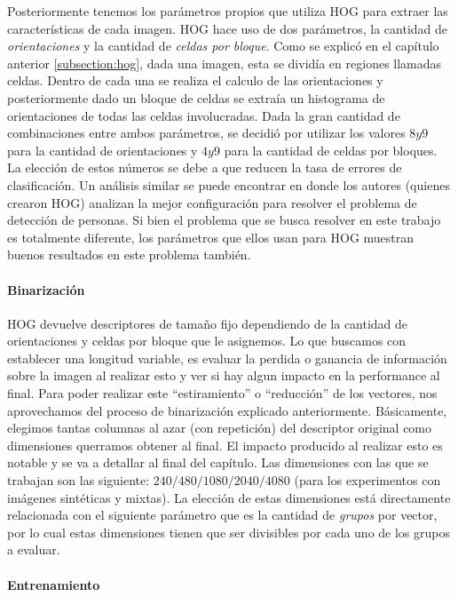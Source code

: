 	Posteriormente tenemos los parámetros propios que utiliza HOG para extraer las características de cada imagen. HOG hace uso de dos parámetros, la cantidad de \textit{orientaciones} y la cantidad de \textit{celdas por bloque}. Como se explicó en el capítulo anterior \ref{subsection:hog}, dada una imagen, esta se dividía en regiones llamadas celdas. Dentro de cada una se realiza el calculo de las orientaciones y posteriormente dado un bloque de celdas se extraía un histograma de orientaciones de todas las celdas involucradas. Dada la gran cantidad de combinaciones entre ambos parámetros, se decidió por utilizar los valores $8 y 9$ para la cantidad de orientaciones y $4 y 9$ para la cantidad de celdas por bloques. La elección de estos números se debe a que reducen la tasa de errores de clasificación. Un análisis similar se puede encontrar en \cite{DT05} donde los autores (quienes crearon HOG) analizan la mejor configuración para resolver el problema de detección de personas. Si bien el problema que se busca resolver en este trabajo es totalmente diferente, los parámetros que ellos usan para HOG muestran buenos resultados en este problema también.

	\paragraph{Binarización}

	HOG devuelve descriptores de tamaño fijo dependiendo de la cantidad de orientaciones y celdas por bloque que le asignemos. Lo que buscamos con establecer una longitud variable, es evaluar la perdida o ganancia de información sobre la imagen al realizar esto y ver si hay algun impacto en la performance al final. Para poder realizar este ``estiramiento'' o ``reducción'' de los vectores, nos aprovechamos del proceso de binarización explicado anteriormente. Básicamente, elegimos tantas columnas al azar (con repetición) del descriptor original como dimensiones querramos obtener al final. El impacto producido al realizar esto es notable y se va a detallar al final del capítulo. Las dimensiones con las que se trabajan son las siguiente: $240/480/1080/2040/4080$ (para los experimentos con imágenes sintéticas y mixtas). La elección de estas dimensiones está directamente relacionada con el siguiente parámetro que es la cantidad de \textit{grupos} por vector, por lo cual estas dimensiones tienen que ser divisibles por cada uno de los grupos a evaluar.

	\paragraph{Entrenamiento}


